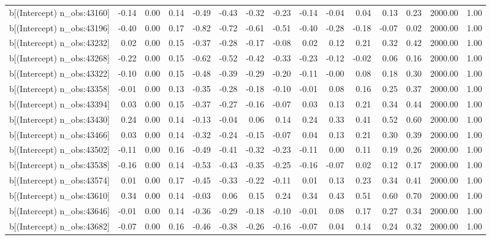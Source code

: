 \begin{table}[ht]
\begin{tabular}{rrrrrrrrrrrrrrr}
  b[(Intercept) n\_obs:43160] & -0.14 & 0.00 & 0.14 & -0.49 & -0.43 & -0.32 & -0.23 & -0.14 & -0.04 & 0.04 & 0.13 & 0.23 & 2000.00 & 1.00 \\ 
  b[(Intercept) n\_obs:43196] & -0.40 & 0.00 & 0.17 & -0.82 & -0.72 & -0.61 & -0.51 & -0.40 & -0.28 & -0.18 & -0.07 & 0.02 & 2000.00 & 1.00 \\ 
  b[(Intercept) n\_obs:43232] & 0.02 & 0.00 & 0.15 & -0.37 & -0.28 & -0.17 & -0.08 & 0.02 & 0.12 & 0.21 & 0.32 & 0.42 & 2000.00 & 1.00 \\ 
  b[(Intercept) n\_obs:43268] & -0.22 & 0.00 & 0.15 & -0.62 & -0.52 & -0.42 & -0.33 & -0.23 & -0.12 & -0.02 & 0.06 & 0.16 & 2000.00 & 1.00 \\ 
  b[(Intercept) n\_obs:43322] & -0.10 & 0.00 & 0.15 & -0.48 & -0.39 & -0.29 & -0.20 & -0.11 & -0.00 & 0.08 & 0.18 & 0.30 & 2000.00 & 1.00 \\ 
  b[(Intercept) n\_obs:43358] & -0.01 & 0.00 & 0.13 & -0.35 & -0.28 & -0.18 & -0.10 & -0.01 & 0.08 & 0.16 & 0.25 & 0.37 & 2000.00 & 1.00 \\ 
  b[(Intercept) n\_obs:43394] & 0.03 & 0.00 & 0.15 & -0.37 & -0.27 & -0.16 & -0.07 & 0.03 & 0.13 & 0.21 & 0.34 & 0.44 & 2000.00 & 1.00 \\ 
  b[(Intercept) n\_obs:43430] & 0.24 & 0.00 & 0.14 & -0.13 & -0.04 & 0.06 & 0.14 & 0.24 & 0.33 & 0.41 & 0.52 & 0.60 & 2000.00 & 1.00 \\ 
  b[(Intercept) n\_obs:43466] & 0.03 & 0.00 & 0.14 & -0.32 & -0.24 & -0.15 & -0.07 & 0.04 & 0.13 & 0.21 & 0.30 & 0.39 & 2000.00 & 1.00 \\ 
  b[(Intercept) n\_obs:43502] & -0.11 & 0.00 & 0.16 & -0.49 & -0.41 & -0.32 & -0.23 & -0.11 & 0.00 & 0.11 & 0.19 & 0.26 & 2000.00 & 1.00 \\ 
  b[(Intercept) n\_obs:43538] & -0.16 & 0.00 & 0.14 & -0.53 & -0.43 & -0.35 & -0.25 & -0.16 & -0.07 & 0.02 & 0.12 & 0.17 & 2000.00 & 1.00 \\ 
  b[(Intercept) n\_obs:43574] & 0.01 & 0.00 & 0.17 & -0.45 & -0.33 & -0.22 & -0.11 & 0.01 & 0.13 & 0.23 & 0.34 & 0.41 & 2000.00 & 1.00 \\ 
  b[(Intercept) n\_obs:43610] & 0.34 & 0.00 & 0.14 & -0.03 & 0.06 & 0.15 & 0.24 & 0.34 & 0.43 & 0.51 & 0.60 & 0.70 & 2000.00 & 1.00 \\ 
  b[(Intercept) n\_obs:43646] & -0.01 & 0.00 & 0.14 & -0.36 & -0.29 & -0.18 & -0.10 & -0.01 & 0.08 & 0.17 & 0.27 & 0.34 & 2000.00 & 1.00 \\ 
  b[(Intercept) n\_obs:43682] & -0.07 & 0.00 & 0.16 & -0.46 & -0.38 & -0.26 & -0.16 & -0.07 & 0.04 & 0.14 & 0.24 & 0.32 & 2000.00 & 1.00 \\ 

\end{tabular}
\end{table}
